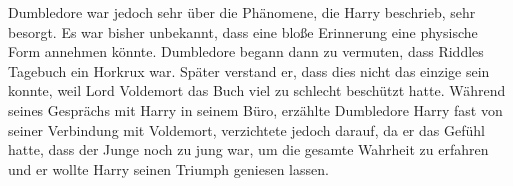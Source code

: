 \documentclass[a4paper, 10pt]{article}
\begin{document}
\vspace{10pt}
\newline
{}  
Dumbledore war jedoch sehr über die Phänomene, die Harry beschrieb, sehr besorgt. Es war bisher unbekannt, dass eine bloße Erinnerung eine physische Form annehmen könnte. Dumbledore begann dann zu vermuten, dass Riddles Tagebuch ein Horkrux war. Später verstand er, dass dies nicht das einzige sein konnte, weil Lord Voldemort das Buch viel zu schlecht beschützt hatte.
\vspace{10pt}
\newline
{}  
Während seines Gesprächs mit Harry in seinem Büro, erzählte Dumbledore Harry fast von seiner Verbindung mit Voldemort, verzichtete jedoch darauf, da er das Gefühl hatte, dass der Junge noch zu jung war, um die gesamte Wahrheit zu erfahren und er wollte Harry seinen Triumph geniesen lassen.
\end{document}
